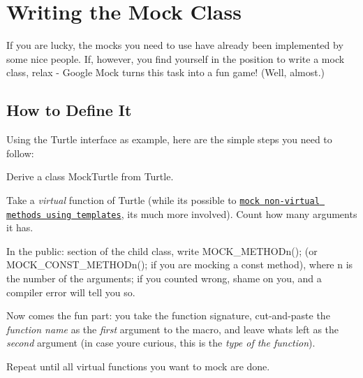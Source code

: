 \section*{Writing the Mock Class}

If you are lucky, the mocks you need to use have already been implemented by some nice people. If, however, you find yourself in the position to write a mock class, relax -\/ Google Mock turns this task into a fun game! (Well, almost.)

\subsection*{How to Define It}

Using the {\ttfamily Turtle} interface as example, here are the simple steps you need to follow\+:


\begin{DoxyEnumerate}
\item Derive a class {\ttfamily Mock\+Turtle} from {\ttfamily Turtle}.
\end{DoxyEnumerate}
\begin{DoxyEnumerate}
\item Take a {\itshape virtual} function of {\ttfamily Turtle} (while it\textquotesingle{}s possible to \href{CookBook.md#mocking-nonvirtual-methods}{\tt mock non-\/virtual methods using templates}, it\textquotesingle{}s much more involved). Count how many arguments it has.
\end{DoxyEnumerate}
\begin{DoxyEnumerate}
\item In the {\ttfamily public\+:} section of the child class, write {\ttfamily M\+O\+C\+K\+\_\+\+M\+E\+T\+H\+O\+Dn();} (or {\ttfamily M\+O\+C\+K\+\_\+\+C\+O\+N\+S\+T\+\_\+\+M\+E\+T\+H\+O\+Dn();} if you are mocking a {\ttfamily const} method), where {\ttfamily n} is the number of the arguments; if you counted wrong, shame on you, and a compiler error will tell you so.
\end{DoxyEnumerate}
\begin{DoxyEnumerate}
\item Now comes the fun part\+: you take the function signature, cut-\/and-\/paste the {\itshape function name} as the {\itshape first} argument to the macro, and leave what\textquotesingle{}s left as the {\itshape second} argument (in case you\textquotesingle{}re curious, this is the {\itshape type of the function}).
\end{DoxyEnumerate}
\begin{DoxyEnumerate}
\item Repeat until all virtual functions you want to mock are done.
\end{DoxyEnumerate}

